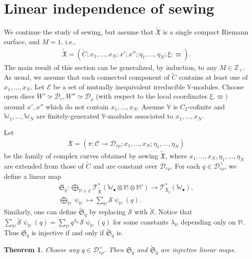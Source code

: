 \documentclass[12pt,a4paper,notitlepage]{report}
\theoremstyle{definition}
\theoremstyle{plain}
\newtheorem{thm}[df]{Theorem}
\newcommand{\fk}{\mathfrak}
\newcommand{\mc}{\mathcal}
\newcommand{\wtd}{\widetilde}
\newcommand{\scr}{\mathscr}
\newcommand{\blt}{\bullet}
\newcommand{\Vbb}{\mathbb V}
\newcommand{\Wbb}{\mathbb W}
\newcommand{\Mbb}{\mathbb M}
\newcommand{\Zbb}{\mathbb Z}
\numberwithin{equation}{section}
\begin{document}
\section{Linear independence of sewing}\label{lb104}

We continue the study of sewing, but assume that $\wtd{\fk X}$ is a single compact Riemann surface, and $M=1$, i.e.,
\begin{align*}
\wtd{\fk X}=(\wtd C;x_1,\dots,x_N;x';x'';\eta_1,\dots,\eta_N;\xi;\varpi).
\end{align*}
The main result of this section can be generalized, by induction, to any $M\in\Zbb_+$. As usual, we assume that each connected component of $\wtd C$ contains at least one of $x_1,\dots,x_N$. Let $\mc E$ be a set of mutually inequivalent irreducible $\Vbb$-modules. Choose open discs $W'\simeq \mc D_r,W''\simeq\mc D_\rho$ (with respect to the local coordinates $\xi,\varpi$) around $x',x''$ which do not contain $x_1,\dots,x_N$. Assume $\Vbb$ is $C_2$-cofinite and $\Wbb_1,\dots,\Wbb_N$ are finitely-generated $\Vbb$-modules associated to $x_1,\dots,x_N$. 

Let
\begin{align*}
\fk X=(\pi:\mc C\rightarrow\mc D_{r\rho};x_1,\dots,x_N;\eta_1,\dots,\eta_N)
\end{align*}
be the family of complex curves obtained by sewing $\wtd{\fk X}$, where $x_1,\dots,x_N,\eta_1,\dots,\eta_N$ are extended from those of $\wtd C$ and are constant over $\mc D_{r\rho}$. For each $q\in\mc D_{r\rho}^\times$, we define a linear map
\begin{gather}
\fk S_q:\bigoplus_{\Mbb\in\mc E}\scr T_{\wtd{\fk X}}^*(\Wbb_\blt\otimes\Mbb\otimes\Mbb')\rightarrow\scr T_{\fk X_q}^*(\Wbb_\blt),\label{eq191}\\
\bigoplus_\Mbb\uppsi_\Mbb\mapsto \sum_\Mbb\mc S\uppsi_\Mbb(q).\nonumber
\end{gather}
Similarly, one can define $\wtd{\fk S}_q$ by replacing $\mc S$ with $\wtd{\mc S}$. Notice that $\sum_\Mbb\wtd{\mc S}\uppsi_\Mbb(q)=\sum_\Mbb q^{\lambda_\Mbb}\mc S\uppsi_\Mbb(q)$ for some constants $\lambda_\Mbb$ depending only on $\Mbb$. Thus $\fk S_q$ is injective if and only if $\wtd{\fk S}_q$ is.


\begin{thm}\label{lb114}
Choose any $q\in\mc D_{r\rho}^\times$. Then $\fk S_q$ and $\wtd{\fk S}_q$ are injective linear maps.
\end{thm}
\end{document}
